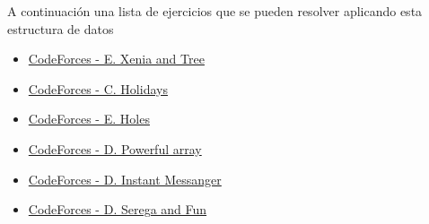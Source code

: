 A continuación una lista de ejercicios que se pueden resolver aplicando esta estructura de datos

\begin{itemize}
	\item \href{https://codeforces.com/contest/342/problem/E}{CodeForces - E. Xenia and Tree}
	\item \href{https://codeforces.com/contest/44/problem/C}{CodeForces - C. Holidays}
	\item \href{https://codeforces.com/contest/13/problem/E}{CodeForces - E. Holes}
	\item \href{https://codeforces.com/contest/86/problem/D}{CodeForces - D. Powerful array}
	\item \href{https://codeforces.com/contest/398/problem/D}{CodeForces - D. Instant Messanger}
	\item \href{https://codeforces.com/contest/455/problem/D}{CodeForces - D. Serega and Fun}
\end{itemize}